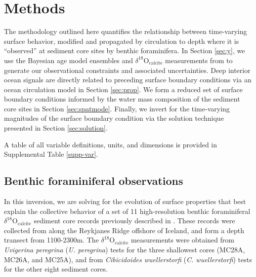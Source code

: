 \documentclass[draft]{agujournal2019}
\begin{document}
\section{Methods}
The methodology outlined here quantifies the relationship between time-varying surface behavior, modified and propagated by circulation to depth where it is ``observed'' at sediment core sites by benthic foraminifera. In Section \ref{sec:y}, we use the Bayesian age model ensembles and $\delta^{18}\mathrm{O}_{\mathrm{calcite}}$ measurements from  to generate our observational constraints and associated uncertainties. Deep interior ocean signals are directly related to preceding surface boundary conditions via an ocean circulation model in Section \ref{sec:prop}. We form a reduced set of surface boundary conditions informed by the water mass composition of the sediment core sites in Section \ref{sec:spatmode}. Finally, we invert for the time-varying magnitudes of the surface boundary condition via the solution technique presented in Section \ref{sec:solution}.

A table of all variable definitions, units, and dimensions is provided in Supplemental Table \ref{supp-var}. 

\subsection{Benthic foraminiferal observations \label{sec:y}}
In this inversion, we are solving for the evolution of surface properties that best explain the collective behavior of a set of 11 high-resolution benthic foraminiferal $\delta^{18}\mathrm{O}_{\mathrm{calcite}}$ sediment core records previously described in . These records were collected from along the Reykjanes Ridge offshore of Iceland, and form a depth transect from 1100-2300m. The $\delta^{18}\mathrm{O}_{\mathrm{calcite}}$ measurements were obtained from \textit{Uvigerina peregrina} (\textit{U. peregrina}) tests for the three shallowest cores (MC28A, MC26A, and MC25A), and from \textit{Cibicidoides wuellerstorfi} (\textit{C. wuellerstorfi}) tests for the other eight sediment cores.
\end{document}
